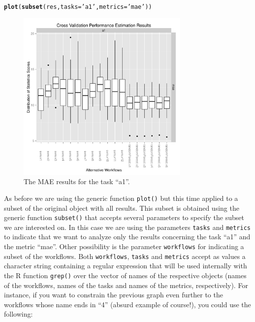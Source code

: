 \documentclass[10pt,a4paper]{article}\usepackage[]{graphicx}\usepackage[]{color}
\makeatletter
\newcommand{\hlstr}[1]{\textcolor[rgb]{0.192,0.494,0.8}{#1}}%
\newcommand{\hlstd}[1]{\textcolor[rgb]{0.345,0.345,0.345}{#1}}%
\newcommand{\hlkwc}[1]{\textcolor[rgb]{0.333,0.667,0.333}{#1}}%
\newcommand{\hlkwd}[1]{\textcolor[rgb]{0.737,0.353,0.396}{\textbf{#1}}}%
\newenvironment{kframe}{%
 \def\at@end@of@kframe{}%
 \ifinner\ifhmode%
  \def\at@end@of@kframe{\end{minipage}}%
  \begin{minipage}{\columnwidth}%
 \fi\fi%
 \def\FrameCommand##1{\hskip\@totalleftmargin \hskip-\fboxsep
 \colorbox{shadecolor}{##1}\hskip-\fboxsep
     \hskip-\linewidth \hskip-\@totalleftmargin \hskip\columnwidth}%
 \MakeFramed {\advance\hsize-\width
   \@totalleftmargin\z@ \linewidth\hsize
   \@setminipage}}%
 {\par\unskip\endMakeFramed%
 \at@end@of@kframe}
\newenvironment{knitrout}{}{} %
\makeatother
\begin{document}
\begin{knitrout}\footnotesize
{}\color{fgcolor}\begin{kframe}
\begin{alltt}
\hlkwd{plot}\hlstd{(}\hlkwd{subset}\hlstd{(res,} \hlkwc{tasks}\hlstd{=}\hlstr{'a1'}\hlstd{,} \hlkwc{metrics}\hlstd{=}\hlstr{'mae'}\hlstd{))}
\end{alltt}
\end{kframe}\begin{figure}[]


{\centering \includegraphics[width=0.75\textwidth]{figures/perfEst-maeA1} 

}

\caption[The MAE results for the task ``a1'']{The MAE results for the task ``a1''.\label{fig:maeA1}}
\end{figure}


\end{knitrout}
 
As before we are using the generic function \texttt{plot()} but this
time applied to a subset of the original object with all results. This
subset is obtained using the generic function \texttt{subset()} that
accepts several parameters to specify the subset we are interested
on. In this case we are using the parameters \texttt{tasks} and
\texttt{metrics} to indicate that we want to analyze only the results
concerning the task ``a1'' and the metric ``mae''. Other possibility
is the parameter \texttt{workflows} for indicating a subset of the
workflows. Both \texttt{workflows}, \texttt{tasks} and \texttt{metrics} accept
as values a character string containing a regular expression that will
be used internally with the R function \texttt{grep()} over the vector
of names of the respective objects (names of the workflows, names of
the tasks and names of the metrics, respectively). For instance, if
you want to constrain the previous graph even further to the workflows
whose name ends in ``4'' (absurd example of course!), you could use
the following:
\end{document}
